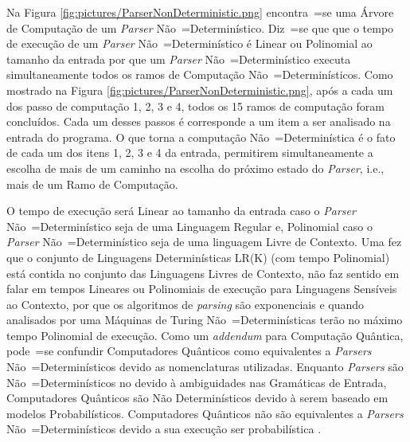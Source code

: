 {    Na Figura \ref{fig:pictures/ParserNonDeterministic.png} encontra~=se uma
    Árvore de Computação de um \textit{Parser} Não~=Determinístico.
    Diz~=se que que o tempo de execução de um \textit{Parser} Não~=Determinístico é Linear ou
    Polinomial ao tamanho da entrada por que um \textit{Parser} Não~=Determinístico
    executa simultaneamente todos os ramos de Computação Não~=Determinísticos.
    Como mostrado na Figura \ref{fig:pictures/ParserNonDeterministic.png},
    após a cada um dos passo de computação 1,
    2, 3 e 4,
    todos os 15 ramos de computação foram concluídos.
    Cada um desses passos é corresponde a um item a ser analisado na entrada do programa.
    O que torna a computação Não~=Determinística é o fato de cada um dos itens 1,
    2, 3 e 4 da entrada,
    permitirem simultaneamente a escolha de mais de um caminho
    na escolha do próximo estado do \textit{Parser},
    i.e.,
    mais de um Ramo de Computação.

    O tempo de execução será Linear ao tamanho da entrada caso o
    \textit{Parser} Não~=Determinístico seja de uma Linguagem Regular e,
    Polinomial caso o \textit{Parser} Não~=Determinístico seja de uma linguagem Livre de Contexto.
    Uma fez que o conjunto de Linguagens Determinísticas LR(K) (com tempo
    Polinomial) está contida no conjunto das Linguagens Livres de Contexto,
    não faz sentido em falar em tempos Lineares ou Polinomiais
    de execução para Linguagens Sensíveis ao Contexto,
    por que os algoritmos de \textit{parsing} são exponenciais e
    quando analisados por uma Máquinas de Turing Não~=Determinísticas
    terão no máximo tempo Polinomial de execução.
    Como um \textit{addendum} para Computação Quântica,
    pode~=se confundir Computadores Quânticos como equivalentes a \textit{Parsers}
    Não~=Determinísticos devido as nomenclaturas utilizadas.
    Enquanto \textit{Parsers} são Não~=Determinísticos no
    devido à ambiguidades nas Gramáticas de Entrada,
    Computadores Quânticos são Não Determinísticos
    devido à serem baseado em modelos
    Probabilísticos.
    Computadores Quânticos não são equivalentes a \textit{Parsers}
    Não~=Determinísticos devido a sua execução ser probabilística
    \cite{polynomialQuantumComputers}.

}
